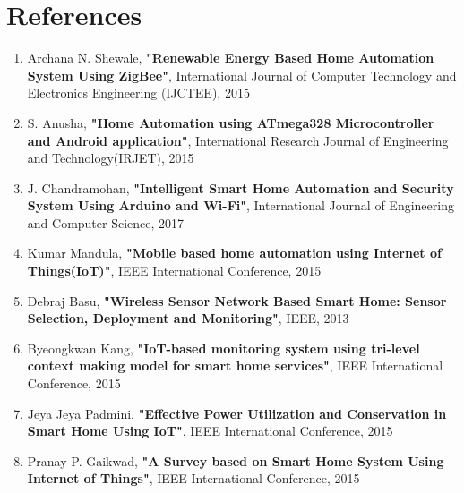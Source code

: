 \chapter{References}
\begin{enumerate}
	\item Archana N. Shewale, \textbf{"Renewable Energy Based Home Automation System Using ZigBee"}, International Journal of Computer Technology and Electronics Engineering (IJCTEE), 2015
	
	\item S. Anusha, \textbf{"Home Automation using ATmega328 Microcontroller and Android application"}, International Research Journal of Engineering and Technology(IRJET), 2015
	
	\item J. Chandramohan, \textbf{"Intelligent Smart Home Automation and Security System Using Arduino and Wi-Fi"}, International Journal of Engineering and Computer Science, 2017
	
	\item Kumar Mandula, \textbf{"Mobile based home automation using Internet of Things(IoT)"}, IEEE International Conference, 2015
	
	\item Debraj Basu, \textbf{"Wireless Sensor Network Based Smart Home: Sensor Selection, Deployment and Monitoring"}, IEEE, 2013
	
	\item Byeongkwan Kang, \textbf{"IoT-based monitoring system using tri-level context making model for smart home services"}, IEEE International Conference, 2015
	
	\item Jeya Jeya Padmini, \textbf{"Effective Power Utilization and Conservation in Smart Home Using IoT"}, IEEE International Conference, 2015
	
	\item Pranay P. Gaikwad, \textbf{"A Survey based on Smart Home System Using Internet of Things"}, IEEE International Conference, 2015
\end{enumerate}